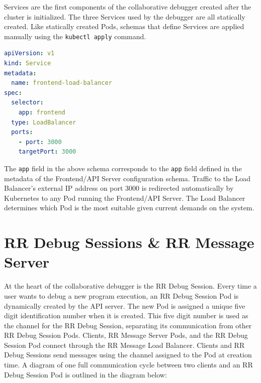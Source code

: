 \documentclass[12pt]{article}
\begin{document}
Services are the first components of the collaborative debugger
created after the cluster is initialized.  The three Services used by
the debugger are all statically created.  Like statically created
Pods, schemas that define Services are applied manually using the
\lstinline{kubectl apply} command.

\begin{lstlisting}[language=YAML,basicstyle=\linespread{0.5}\ttfamily,caption={Frontend Load Balancer Schema},captionpos=b]
apiVersion: v1
kind: Service
metadata:
  name: frontend-load-balancer
spec:
  selector:
    app: frontend
  type: LoadBalancer
  ports:
    - port: 3000
    targetPort: 3000
\end{lstlisting}

The \lstinline{app} field in the above schema corresponds to the
\lstinline{app} field defined in the metadata of the Frontend/API
Server configuration schema.  Traffic to the Load Balancer's external
IP address on port 3000 is redirected automatically by Kubernetes to
any Pod running the Frontend/API Server.  The Load Balancer determines
which Pod is the most suitable given current demands on the system.

\section{RR Debug Sessions \& RR Message Server}

At the heart of the collaborative debugger is the RR Debug Session.
Every time a user wants to debug a new program execution, an RR Debug
Session Pod is dynamically created by the API server.  The new Pod is
assigned a unique five digit identification number when it is created.
This five digit number is used as the channel for the RR Debug
Session, separating its communication from other RR Debug Session
Pods.  Clients, RR Message Server Pods, and the RR Debug Session Pod
connect through the RR Message Load Balancer.  Clients and RR Debug
Sessions send messages using the channel assigned to the Pod at
creation time.  A diagram of one full communication cycle between two
clients and an RR Debug Session Pod is outlined in the diagram below:
\end{document}
